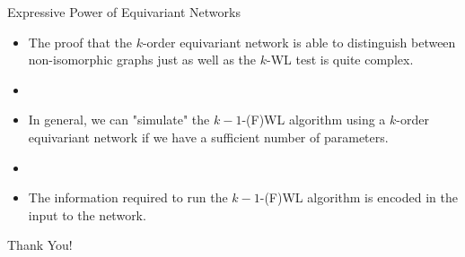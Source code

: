 \documentclass{beamer}
\begin{document}
\begin{frame}{Expressive Power of Equivariant Networks}
    \begin{itemize}
        \item The proof that the $k$-order equivariant network is able to distinguish between non-isomorphic graphs just as well as the $k$-WL test is quite complex.
        \item \pause
        \item In general, we can "simulate" the $k-1$-(F)WL algorithm using a $k$-order equivariant network if we have a sufficient number of parameters.
        \item \pause
        \item The information required to run the $k-1$-(F)WL algorithm is encoded in the input to the network.
    \end{itemize}
\end{frame}
\begin{frame}[plain]
    \centering
    \Huge Thank You!
\end{frame}
\end{document}
